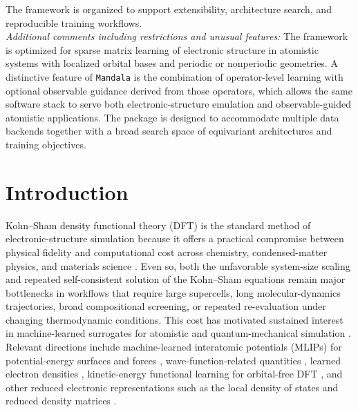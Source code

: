 \documentclass[preprint,12pt,compress,numafflabel]{elsarticle}
\begin{document}
\begin{small}
The framework is organized to support extensibility, architecture search, and reproducible training workflows. \\
{\em Additional comments including restrictions and unusual features:} The framework is optimized for sparse matrix learning of electronic structure in atomistic systems with localized orbital bases and periodic or nonperiodic geometries. A distinctive feature of \texttt{Mandala} is the combination of operator-level learning with optional observable guidance derived from those operators, which allows the same software stack to serve both electronic-structure emulation and observable-guided atomistic applications. The package is designed to accommodate multiple data backends together with a broad search space of equivariant architectures and training objectives.
\end{small}

\section{Introduction}
\label{sec:introduction}

Kohn--Sham density functional theory (DFT) is the standard method of electronic-structure simulation because it offers a practical compromise between physical fidelity and computational cost across chemistry, condensed-matter physics, and materials science \cite{HoKo1964,KoSh1965}. Even so, both the unfavorable system-size scaling and repeated self-consistent solution of the Kohn--Sham equations remain major bottlenecks in workflows that require large supercells, long molecular-dynamics trajectories, broad compositional screening, or repeated re-evaluation under changing thermodynamic conditions. This cost has motivated sustained interest in machine-learned surrogates for atomistic and quantum-mechanical simulation \cite{deepdive}. Relevant directions include machine-learned interatomic potentials (MLIPs) for potential-energy surfaces and forces \cite{BehlerParrinello2007,BartokGAP2010,ZhangDeepMD2018,BatznerNequIP2022,BatatiaMACE2022}, wave-function-related quantities \cite{PfauFermiNet2020,HermannPauliNet2020}, learned electron densities \cite{BrVo2017,GrisafiElectronDensity2019,malapaper,Rackers_2023}, kinetic-energy functional learning for orbital-free DFT \cite{ALGHADEER2021127621,ghasemi2021}, and other reduced electronic representations such as the local density of states and reduced density matrices \cite{malapaper,Shao_2023,chandrasekaran_solving_2019,temperaturepaper,sizetransferpaper}.
\end{document}
